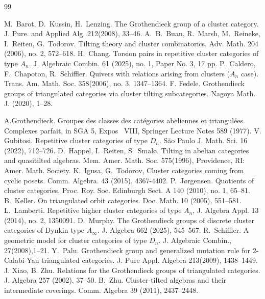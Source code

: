 \documentclass[a4paper,reqno,11pt]{amsart}
\theoremstyle{definition}
\begin{document}
\begin{thebibliography}{99}

 M.~Barot, D.~Kussin, H.~Lenzing. The Grothendieck group of a cluster category. J. Pure. and Applied Alg. 212(2008), 33--46.
%
 A.~B.~Buan, R.~Marsh, M.~Reineke, I.~Reiten, G.~Todorov. Tilting theory
and cluster combinatorics. Adv. Math. 204 (2006), no. 2, 572--618.
%
 H.~Chang. Torsion pairs in repetitive cluster categories of type $A_n$.
    J. Algebraic Combin. 61 (2025), no. 1, Paper No. 3, 17 pp.
%
 P.~Caldero, F.~Chapoton, R.~Schiffler. Quivers with relations arising from clusters ($A_n$ case).
 Trans. Am. Math. Soc. 358(2006), no. 3, 1347--1364.
%
 F. Fedele. Grothendieck groups of triangulated categories via cluster tilting subcategories. Nagoya Math. J. (2020), 1--28.

  A.Grothendieck. Groupes des classes des cat\'{e}gories abeliennes et triangul\'{e}es. Complexes
parfait, in SGA 5, Expos~ VIII, Springer Lecture Notes 589 (1977).
%
 V. Gubitosi. Repetitive cluster categories of type $D_n$. S\~{a}o Paulo J. Math. Sci. 16 (2022), 712--726.
%
 D.~Happel, I.~Reiten, S.~Smal{\o}. Tilting in abelian categories and quasitilted
algebras. Mem. Amer. Math. Soc. 575(1996), Providence, RI: Amer. Math. Society.
%
 K.~Igusa, G.~Todorov, Cluster categories coming from cyclic posets. Comm. Algebra. 43 (2015), 4367-4402.
%
 P.~J{\o}rgensen. Quotients of cluster categories. Proc. Roy. Soc. Edinburgh Sect. A 140 (2010), no. 1, 65--81.
%
 B.~Keller. On triangulated orbit categories. Doc. Math. 10 (2005), 551--581.
%
 L.~Lamberti. Repetitive higher cluster categories of type $A_n$, J. Algebra Appl. 13 (2014),  no. 2, 1350091.
%
 D.~Murphy. The Grothendieck groups of discrete cluster categories of Dynkin type $A_{\infty}$. J. Algebra 662 (2025), 545--567.
%
 R.~Schiffler. A geometric model for cluster categories of type $D_n$. J. Algebraic Combin., 27(2008),1--21.
%
 Y.~Palu. Grothendieck group and generalized mutation rule for $2$-Calabi-Yau triangulated categories. J. Pure Appl. Algebra 213(2009),  1438--1449.
 J. Xiao, B. Zhu.
Relations for the Grothendieck groups of triangulated categories. J. Algebra 257 (2002), 37--50.
%
 B.~Zhu. Cluster-tilted algebras and their intermediate coverings.  Comm. Algebra 39 (2011), 2437--2448.
\end{thebibliography}
\end{document}
